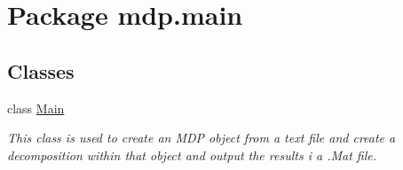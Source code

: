 \hypertarget{namespacemdp_1_1main}{}\section{Package mdp.\+main}
\label{namespacemdp_1_1main}
\subsection*{Classes}
\begin{DoxyCompactItemize}
\item 
class \hyperlink{classmdp_1_1main_1_1_main}{Main}
\begin{DoxyCompactList}\small\item\em This class is used to create an M\+D\+P object from a text file and create a decomposition within that object and output the results i a .Mat file. \end{DoxyCompactList}\end{DoxyCompactItemize}
